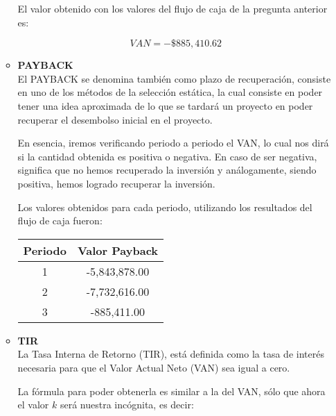 \begin{enumerate}[(a)]
\begin{itemize}
                    El valor obtenido con los valores del flujo de caja de la pregunta anterior es:

                    $$VAN = -\$885,410.62$$

                \item {\bf PAYBACK}\\

                    El PAYBACK se denomina también como plazo de recuperación,
                    consiste en uno de los métodos de la selección estática,
                    la cual consiste en poder tener una idea aproximada
                    de lo que se tardará un proyecto en poder recuperar
                    el desembolso inicial en el proyecto.


                   En esencia, iremos verificando periodo a periodo el VAN, lo cual nos dirá si la cantidad obtenida
                   es positiva o negativa. En caso de ser negativa, significa que no hemos  recuperado la inversión
                   y análogamente, siendo positiva, hemos logrado recuperar la inversión.


                   Los valores obtenidos para cada periodo, utilizando los resultados del flujo de caja fueron:

                   \begin{table}[h!t]
                        \centering
                        \begin{tabular}{|c|c|}
                            \hline
                            {\bf Periodo} & Valor Payback \\\hline
                            1 & -5,843,878.00 \\
                            2 & -7,732,616.00 \\
                            3 &   -885,411.00 \\ \hline
                        \end{tabular}
                   \end{table}
                \newpage
                \item {\bf TIR}\\

                    La Tasa Interna de Retorno (TIR), está definida como la tasa de interés necesaria para que el Valor Actual Neto (VAN) sea igual a cero.

                    La fórmula para poder obtenerla es similar a la del VAN, sólo que ahora el valor $k$ será nuestra incógnita, es decir:


\end{itemize}
\end{enumerate}

